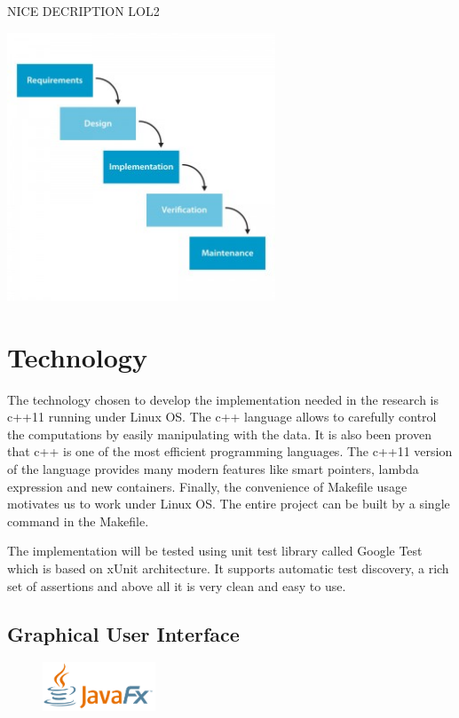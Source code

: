 \documentclass{article}
\begin{document}
{\color{red} NICE DECRIPTION LOL2}

\begin{center}

	\includegraphics[width=80mm]{images/waterfall_model.jpg}

\end{center}


\section{Technology}
The technology chosen to develop the implementation needed in the research is c++11 running under Linux OS. The c++ language allows to carefully control the computations by easily manipulating with the data. It is also been proven that c++ is one of the most efficient programming languages. The c++11 version of the language provides many modern features like smart pointers, lambda expression and new containers. Finally, the convenience of Makefile usage motivates us to work under Linux OS. The entire project can be built by a single command in the Makefile.

The implementation will be tested using unit test library called Google Test which is based on xUnit architecture. It supports automatic test discovery, a rich set of assertions and above all it is very clean and easy to use.




\subsection{Graphical User Interface}

\begin{figure}
  \begin{center}
    \includegraphics[width=0.3\textwidth]{images/javafx_logo.png}
  \end{center}
\end{figure}
\end{document}

